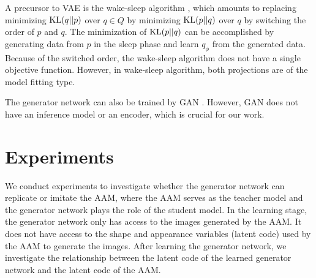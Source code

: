 \documentclass{article}
\begin{document}
A precursor to VAE is the wake-sleep algorithm  \cite{hinton1995wake}, which amounts to replacing minimizing ${\rm KL}(q||p)$ over $q \in Q$ by minimizing ${\rm KL}(p||q)$ over $q$ by switching the order of $p$ and $q$. The minimization of ${\rm KL}(p||q)$ can be accomplished by generating data from $p$ in the sleep phase and learn $q_\phi$ from the generated data. Because of the switched order, the wake-sleep algorithm does not have a single objective function. However, in wake-sleep algorithm, both projections are of the model fitting type. 

The generator network can also be trained by GAN \cite{goodfellow2014generative}. However, GAN does not have an inference model or an encoder, which is crucial for our work. 




\section{Experiments} \label{sec:exp} %

We conduct experiments to investigate whether the generator network can replicate or imitate the AAM, where the AAM serves as the teacher model and the generator network plays the role of the student model. In the learning stage, the generator network only has access to the images generated by the AAM. It does not have access to the shape and appearance variables (latent code) used by the AAM to generate the images. After learning the generator network, we investigate the relationship between the latent code of the learned generator network and the latent code of the AAM. 
\end{document}
